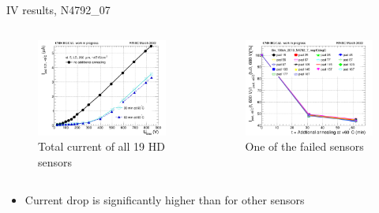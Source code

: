 \documentclass{beamer}
\begin{document}
\begin{frame}{IV results, N4792\_07}
  \begin{columns}
       \begin{figure}
           \includegraphics[width=1.0\textwidth]{plots/annealing_IV_ch101_N4792_7.png}
           \caption{Total current of all 19 HD sensors}
       \end{figure}

       \begin{figure}
           \includegraphics[width=1.0\textwidth]{plots/annealing_current_N4792_7.png}
           \caption{One of the failed sensors}
       \end{figure}
   \end{columns}
   \begin{itemize}
    \item Current drop is significantly higher than for other sensors
   \end{itemize}
\end{frame}
\end{document}

